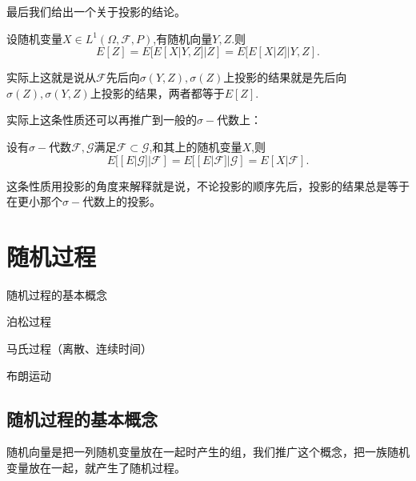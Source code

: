 \documentclass[lang=cn,10pt]{elegantbook}
\begin{document}
	最后我们给出一个关于投影的结论。
	\begin{proposition}
		设随机变量\(X\in L^1(\Omega,\mathcal{F},P)\),有随机向量\(Y,Z.\)则
		\[E[Z]=E[E[X|Y,Z]|Z]=E[E[X|Z]|Y,Z].\]
	\end{proposition}
	\begin{note}
		实际上这就是说从\(\mathcal{F}\)先后向\(\sigma(Y,Z),\sigma(Z)\)上投影的结果就是先后向\(\sigma(Z),\sigma(Y,Z)\)上投影的结果，两者都等于\(E[Z]\).
	\end{note}
	实际上这条性质还可以再推广到一般的\(\sigma-\)代数上：
	\begin{corollary}[塔性]
		设有\(\sigma-\)代数\(\mathcal{F},\mathcal{G}\)满足\(\mathcal{F}\subset \mathcal{G}\),和其上的随机变量\(X\),则
		\[E[[E|\mathcal{G}]|\mathcal{F}]=E[[E|\mathcal{F}]|\mathcal{G}]=E[X|\mathcal{F}].\]
	\end{corollary}
	\begin{note}
		这条性质用投影的角度来解释就是说，不论投影的顺序先后，投影的结果总是等于在更小那个\(\sigma-\)代数上的投影。
	\end{note}
	
	
	\chapter{随机过程}
	\begin{introduction}
		\item 随机过程的基本概念
		\item 泊松过程
		\item 马氏过程（离散、连续时间）
		\item 布朗运动
	\end{introduction}
	\section{随机过程的基本概念}
	随机向量是把一列随机变量放在一起时产生的组，我们推广这个概念，把一族随机变量放在一起，就产生了随机过程。
\end{document}
